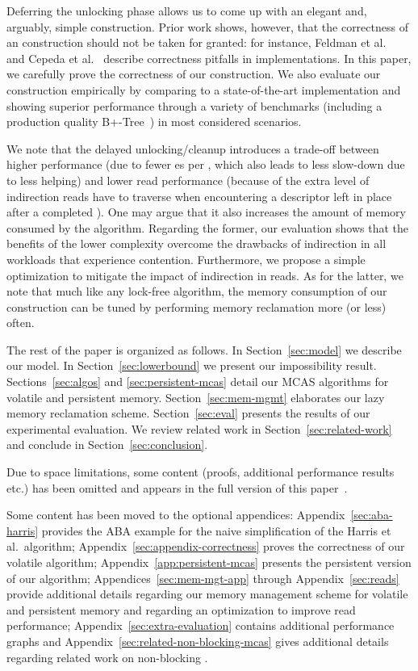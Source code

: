 Deferring the unlocking phase allows us to come up with an elegant and, arguably, simple \mcas{} construction.  
Prior work shows, however, that the correctness of an \mcas{} construction should not be taken for granted:
for instance, Feldman et al.~\cite{feldman15} and Cepeda et al.~\cite{CepedaCLLWG19} describe correctness pitfalls in \mcas{} implementations.
In this paper, we carefully prove the correctness of our construction. 
We also evaluate our construction empirically by comparing to a state-of-the-art \mcas{} implementation and showing superior performance through a variety of benchmarks (including a production quality B+-Tree~\cite{arulraj18}) in most considered scenarios.

We note that the delayed unlocking/cleanup introduces a trade-off between higher \mcas{} performance (due to fewer \cas{}es per \mcas{}, which also leads to less slow-down due to less helping) and lower read performance (because of the extra level of indirection reads have to traverse when encountering a descriptor left in place after a completed \mcas{}). One may argue that it also increases the amount of memory consumed by the \mcas{} algorithm. Regarding the former, our evaluation shows that the benefits of the lower complexity overcome the drawbacks of indirection in all workloads that experience \mcas{} contention. Furthermore, we propose a simple optimization to mitigate the impact
of indirection in reads. As for the latter, we note that much like any lock-free algorithm, the memory consumption of our construction can be tuned by performing memory reclamation more (or less) often. 

The rest of the paper is organized as follows. In Section~\ref{sec:model} we describe our model. In Section~\ref{sec:lowerbound} we present our impossibility result.
Sections~\ref{sec:algos} and \ref{sec:persistent-mcas} detail our MCAS algorithms for volatile and persistent memory.
Section~\ref{sec:mem-mgmt} elaborates our lazy memory reclamation scheme. Section~\ref{sec:eval} presents the results of our experimental evaluation. We review related work in Section~\ref{sec:related-work} and conclude in Section~\ref{sec:conclusion}. 
\begin{camera}
Due to space limitations, some content (proofs, additional performance results etc.) has been omitted and appears in the full version of this paper~\cite{longversion}.
\end{camera}\begin{arxiv}
Some content has been moved to the optional appendices: Appendix~\ref{sec:aba-harris} provides the ABA example for the naive simplification of the Harris et al.\ algorithm; Appendix~\ref{sec:appendix-correctness} proves the correctness of our volatile algorithm; Appendix~\ref{app:persistent-mcas} presents the persistent version of our algorithm; Appendices~\ref{sec:mem-mgt-app} through Appendix~\ref{sec:reads} provide additional details regarding our memory management scheme for volatile and persistent memory and regarding an optimization to improve read performance; Appendix~\ref{sec:extra-evaluation} contains additional performance graphs and Appendix~\ref{sec:related-non-blocking-mcas} gives additional details regarding related work on non-blocking \mcas{}.
\end{arxiv}
